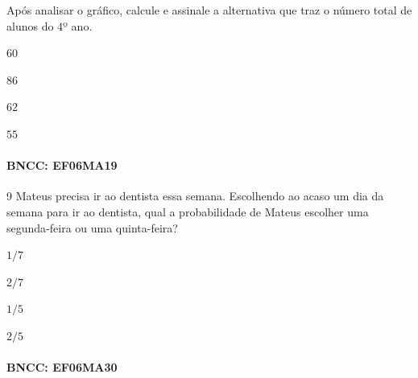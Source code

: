 {Após analisar o gráfico, calcule e assinale a alternativa que traz o
número total de alunos do $4$º ano.

\begin{escolha}
\item $60$
\item $86$
\item $62$
\item $55$
\end{escolha}

\paragraph{BNCC: EF06MA19 }


\num{9}  Mateus precisa ir ao dentista essa semana. Escolhendo ao acaso um dia
da semana para ir ao dentista, qual a probabilidade de Mateus escolher
uma segunda-feira ou uma quinta-feira?

\begin{escolha}
\item
  $1/7$
\item
  $2/7$
\item
  $1/5$
\item
  $2/5$
\end{escolha}


\paragraph{BNCC: EF06MA30 }

}
